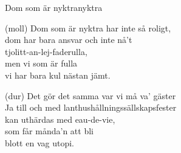 \begin{song}{Dom som är nyktra}{nyktra}
\begin{vers}
(moll) Dom som är nyktra har inte så roligt,\\
dom har bara ansvar och inte nå't\\
tjolitt-an-lej-faderulla,\\
men vi som är fulla\\
vi har bara kul nästan jämt.\\
\end{vers}
\begin{vers}
(dur) Det gör det samma var vi må va' gäster\\
Ja till och med lanthushållningssällskapsfester\\
kan uthärdas med eau-de-vie,\\
som får månda'n att bli\\
blott en vag utopi.\\
\end{vers}
\end{song}
